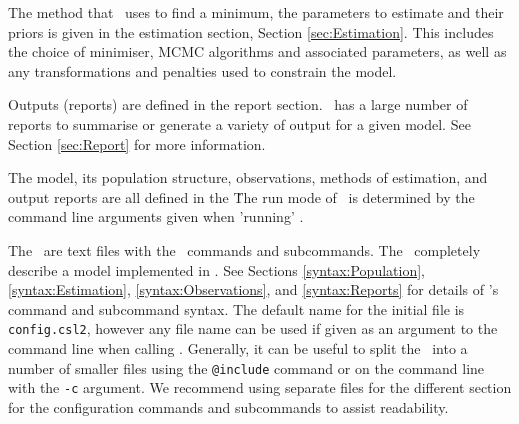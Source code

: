 The method that \CNAME\ uses to find a minimum, the parameters to estimate and their priors is given in the estimation section, Section \ref{sec:Estimation}. This includes the choice of minimiser, MCMC algorithms and associated parameters, as well as any transformations and penalties used to constrain the model.

Outputs (reports) are defined in the report section. \CNAME\ has a large number of reports to summarise or generate a variety of output for a given model. See Section \ref{sec:Report} for more information.

The model, its population structure, observations, methods of estimation, and output reports are all defined in the \config\. The run mode of \CNAME\ is determined by the command line arguments given when 'running' \CNAME.

The \config\ are text files with the \CNAME\ commands and subcommands. The \config\ completely describe a model implemented in \CNAME. See Sections \ref{syntax:Population}, \ref{syntax:Estimation}, \ref{syntax:Observations}, and \ref{syntax:Reports} for details of \CNAME's command and subcommand syntax.  The default name for the initial file is \texttt{config.csl2}, however any file name can be used if given as an argument to the command line when calling \CNAME. Generally, it can be useful to split the \config\ into a number of smaller files using the \texttt{@include} command or on the command line with the \texttt{-c} argument. We recommend using separate files for the different section for the configuration commands and subcommands to assist readability.
